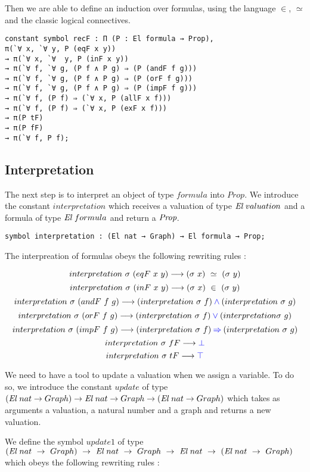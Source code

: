 \documentclass[a4paper]{article}
\begin{document}
Then we are able to define an induction over formulas, using the language $\in$, $\simeq$ and the classic logical connectives.

\begin{lstlisting}
constant symbol recF : Π (P : El formula → Prop), 
π(`∀ x, `∀ y, P (eqF x y))
→ π(`∀ x, `∀  y, P (inF x y))
→ π(`∀ f, `∀ g, (P f ∧ P g) ⇒ (P (andF f g)))
→ π(`∀ f, `∀ g, (P f ∧ P g) ⇒ (P (orF f g)))
→ π(`∀ f, `∀ g, (P f ∧ P g) ⇒ (P (impF f g)))
→ π(`∀ f, (P f) ⇒ (`∀ x, P (allF x f)))
→ π(`∀ f, (P f) ⇒ (`∀ x, P (exF x f)))
→ π(P tF)
→ π(P fF)
→ π(`∀ f, P f);
\end{lstlisting}

\subsection{Interpretation}

The next step is to interpret an object of type $formula$ into $Prop$. We introduce the constant $interpretation$ which receives a valuation of type $\El \ valuation$ and a formula of type $\El \ formula$ and return a ${\mbox{\it Prop}}$.

\begin{lstlisting}
symbol interpretation : (El nat → Graph) → El formula → Prop;
\end{lstlisting}

The interpreation of formulas obeys the following rewriting rules :

$$interpretation \ \sigma \ (eqF \ x \ y) \longrightarrow (\sigma \ x) \ \simeq \ (\sigma \ y)$$
$$interpretation \ \sigma \ (inF \ x \ y) \longrightarrow (\sigma \ x) \ \in \ (\sigma \ y)$$
$$interpretation \ \sigma \ (andF \ f \ g) \lra (interpretation \ \sigma \ f) \conj (interpretation \ \sigma \ g)$$
$$interpretation \ \sigma \ (orF \ f \ g) \longrightarrow (interpretation \ \sigma \ f) \mathbin{\color{blue} \vee}  (interpretation \sigma \ g)$$
$$interpretation \ \sigma \ (impF \ f \ g) \lra (interpretation \ \sigma \ f) \imp (interpretation \ \sigma \ g)$$
$$interpretation \ \sigma \ fF \longrightarrow {\color{blue} \bot}$$
$$interpretation \ \sigma \ tF \longrightarrow {\color{blue} \top}$$

We need to have a tool to update a valuation when we assign a variable. To do so, we introduce the constant $update$ of type $({\mbox{\it El}} \ nat \rightarrow Graph) \rightarrow {\mbox{\it El}} \ nat \rightarrow Graph \rightarrow ({\mbox{\it El}} \ nat \rightarrow Graph)$ which takes as arguments a valuation, a natural number and a graph and returns a new valuation. 

We define the symbol $update1$ of type $(\El \ nat \ \ra \ Graph) \ \ra \ \El \ nat \ \ra \ Graph \ \ra \ \El \ nat \ \ra \ (\El \ nat \ \ra \ Graph)$ which obeys the following rewriting rules : 
\end{document}
